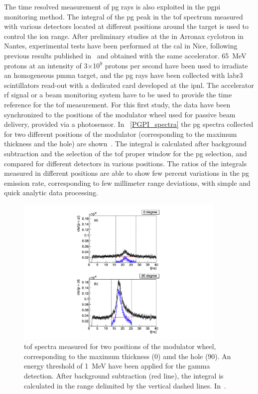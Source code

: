 The time resolved measurement of \gls{pg} rays is also exploited in the \gls{pgpi} monitoring method. The integral of the \gls{pg} peak in the \gls{tof} spectrum measured with various detectors located at different positions around the target is used to control the ion range. After preliminary studies at the in Arronax cyclotron in Nantes, experimental tests have been performed at the \gls{cal} in Nice, following previous results published in~\cite{Carnicer2012} and obtained with the same accelerator. 65~MeV protons at an intensity of 3$\times$10$^9$ protons per second have been used to irradiate an homogeneous \gls{pmma} target, and the \gls{pg} rays have been collected with \gls{labr3} scintillators read-out with a dedicated card developed at the \gls{ipnl}. The accelerator \gls{rf} signal or a beam monitoring system have to be used to provide the time reference for the \gls{tof} measurement. For this first study, the data have been synchronized to the positions of the modulator wheel used for passive beam delivery, provided via a photosensor. In \figurename~\ref{PGPI_spectra} the \gls{pg} spectra collected for two different positions of the modulator (corresponding to the maximum thickness and the hole) are shown~\parencite{Krimmer2017b}. The integral is calculated after background subtraction and the selection of the \gls{tof} proper window for the \gls{pg} selection, and compared for different detectors in various positions. The ratios of the integrals measured in different positions are able to show few percent variations in the \gls{pg} emission rate, corresponding to few millimeter range deviations, with simple and quick analytic data processing.

\begin{figure}[!htbp]
\centering
\includegraphics[width=0.9\textwidth]{03_GraphicFiles/chapter2_GammaCameras/PGPI_spectra.pdf}
\caption{\gls{tof} spectra measured for two positions of the modulator wheel, corresponding to the maximum thickness (0\textdegree) amd the hole (90\textdegree). An energy threshold of 1~MeV have been applied for the gamma detection. After background subtraction (red line), the integral is calculated in the range delimited by the vertical dashed lines. In~\cite{Krimmer2017}.}
\label{chap2::fig::PGPI_spectra}
\end{figure}  

